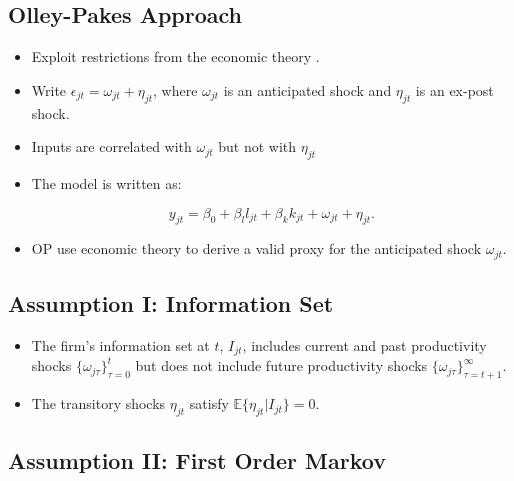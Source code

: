 \documentclass[]{book}
\providecommand{\tightlist}{%
  \setlength{\itemsep}{0pt}\setlength{\parskip}{0pt}}
\begin{document}
\subsection{Olley-Pakes Approach}\label{olley-pakes-approach}

\begin{itemize}
\tightlist
\item
  Exploit restrictions from the economic theory \citep{Olley1996}.
\item
  Write \(\epsilon_{jt} = \omega_{jt} + \eta_{jt}\), where
  \(\omega_{jt}\) is an anticipated shock and \(\eta_{jt}\) is an
  ex-post shock.
\item
  Inputs are correlated with \(\omega_{jt}\) but not with \(\eta_{jt}\)
\item
  The model is written as:

  \begin{equation}
  y_{jt} = \beta_0 + \beta_l l_{jt} + \beta_k k_{jt} + \omega_{jt} + \eta_{jt}.
  \end{equation}
\item
  OP use economic theory to derive a valid proxy for the anticipated
  shock \(\omega_{jt}\).
\end{itemize}

\subsection{Assumption I: Information
Set}\label{assumption-i-information-set}

\begin{itemize}
\tightlist
\item
  The firm's information set at \(t\), \(I_{jt}\), includes current and
  past productivity shocks \(\{\omega_{j\tau}\}_{\tau = 0}^t\) but does
  not include future productivity shocks
  \(\{\omega_{j\tau}\}_{\tau = t + 1}^{\infty}\).
\item
  The transitory shocks \(\eta_{jt}\) satisfy
  \(\mathbb{E}\{\eta_{jt}|I_{jt}\} = 0\).
\end{itemize}

\subsection{Assumption II: First Order
Markov}\label{assumption-ii-first-order-markov}
\end{document}
